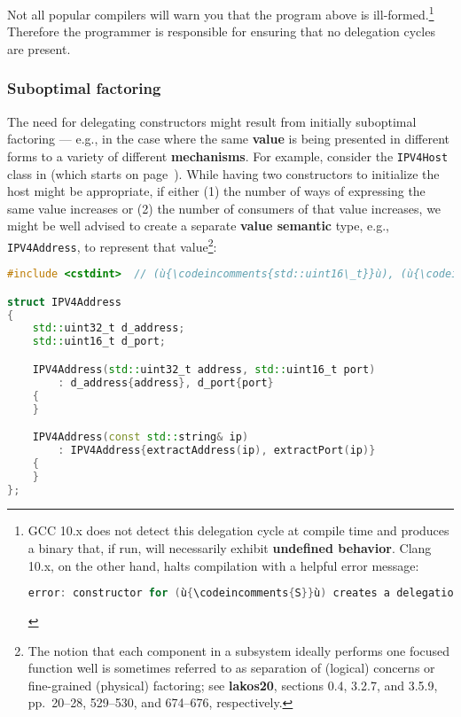 \noindent Not all popular compilers will warn you that the program above is
ill-formed.{\cprotect\footnote{GCC 10.x does not detect this delegation
cycle at compile time and produces a binary that, if run, will
necessarily exhibit \textbf{undefined behavior}. Clang 10.x, on the
other hand, halts compilation with a helpful error message:

\begin{lstlisting}[language=C++, basicstyle={\ttfamily\footnotesize}]
error: constructor for (ù{\codeincomments{S}}ù) creates a delegation cycle
\end{lstlisting}\vspace*{-1ex}
      }} Therefore the programmer is responsible for ensuring that
no delegation cycles are present.

\subsubsection[Suboptimal factoring]{Suboptimal factoring}\label{suboptimal-factoring}

The need for delegating constructors might result from initially
suboptimal factoring --- e.g., in the case where the same \textbf{value}
is being presented in different forms to a variety of different
\textbf{mechanisms}. For example, consider the \texttt{IPV4Host} class
in {\it{}} (which starts on page~\pageref{ctordelegating-use-cases}). While having two constructors to
initialize the host might be appropriate, if either (1) the number of
ways of expressing the same value increases or (2) the number of
consumers of that value increases, we might be well advised to create a
separate \textbf{value semantic} type, e.g., \texttt{IPV4Address}, to
represent that value{\cprotect\footnote{The notion that each component
in a subsystem ideally performs one focused function well is sometimes
referred to as separation of (logical) concerns or
  fine-grained (physical) factoring; see \textbf{{lakos20}},
  sections 0.4, 3.2.7, and 3.5.9, pp.~20--28, 529--530, and 674--676,
  respectively.}}:

\begin{lstlisting}[language=C++]
#include <cstdint>  // (ù{\codeincomments{std::uint16\_t}}ù), (ù{\codeincomments{std::uint32\_t}}ù)

struct IPV4Address
{
    std::uint32_t d_address;
    std::uint16_t d_port;

    IPV4Address(std::uint32_t address, std::uint16_t port)
        : d_address{address}, d_port{port}
    {
    }

    IPV4Address(const std::string& ip)
        : IPV4Address{extractAddress(ip), extractPort(ip)}
    {
    }
};
\end{lstlisting}

